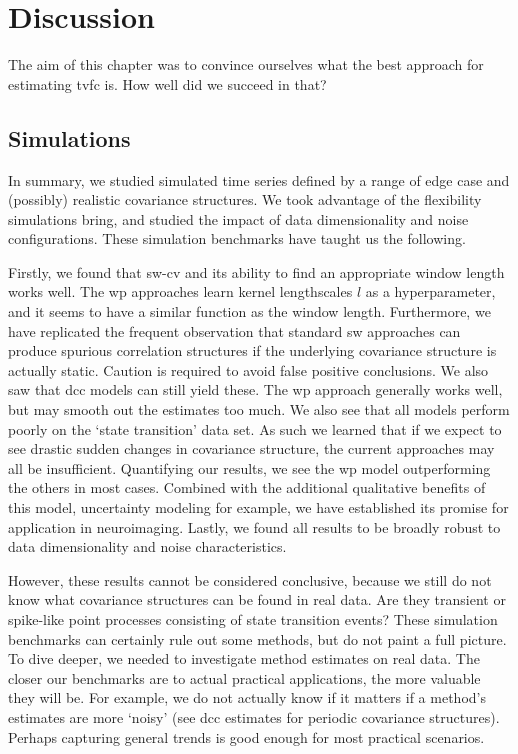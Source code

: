 \clearpage
\section{Discussion}

The aim of this chapter was to convince ourselves what the best approach for estimating \gls{tvfc} is.
How well did we succeed in that?

\subsection{Simulations}

In summary, we studied simulated time series defined by a range of edge case and (possibly) realistic covariance structures.
We took advantage of the flexibility simulations bring, and studied the impact of data dimensionality and noise configurations.
These simulation benchmarks have taught us the following.

Firstly, we found that \gls{sw-cv} and its ability to find an appropriate window length works well.
The \gls{wp} approaches learn kernel lengthscales $l$ as a hyperparameter, and it seems to have a similar function as the window length.
%
Furthermore, we have replicated the frequent observation that standard \gls{sw} approaches can produce spurious correlation structures if the underlying covariance structure is actually static.
Caution is required to avoid false positive conclusions.
We also saw that \gls{dcc} models can still yield these.
%
The \gls{wp} approach generally works well, but may smooth out the estimates too much.
We also see that all models perform poorly on the `state transition' data set.
As such we learned that if we expect to see drastic sudden changes in covariance structure, the current approaches may all be insufficient.
%
Quantifying our results, we see the \gls{wp} model outperforming the others in most cases.
Combined with the additional qualitative benefits of this model, uncertainty modeling for example, we have established its promise for application in neuroimaging.
%
Lastly, we found all results to be broadly robust to data dimensionality and noise characteristics.

However, these results cannot be considered conclusive, because we still do not know what covariance structures can be found in real data.
Are they transient or spike-like point processes consisting of state transition events?
These simulation benchmarks can certainly rule out some methods, but do not paint a full picture.
%
To dive deeper, we needed to investigate method estimates on real data.
The closer our benchmarks are to actual practical applications, the more valuable they will be.
For example, we do not actually know if it matters if a method's estimates are more `noisy' (see \gls{dcc} estimates for periodic covariance structures).
Perhaps capturing general trends is good enough for most practical scenarios.

